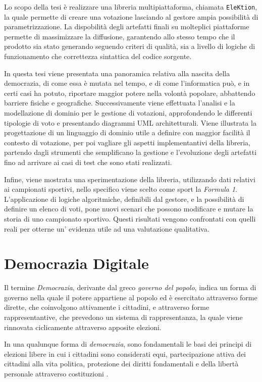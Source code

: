 \documentclass[12pt,a4paper,openright,twoside]{book}
\begin{document}
Lo scopo della tesi è realizzare una libreria multipiattaforma, chiamata \texttt{EleKtion}, la quale permette di creare una votazione
lasciando al gestore ampia possibilità di parametrizzazione.
La dispobilità degli artefatti finali su molteplici piattaforme permette di massimizzare la diffusione, garantendo
allo stesso tempo che il prodotto sia stato generando seguendo criteri di qualità, sia a livello di logiche di funzionamento
che correttezza sintattica del codice sorgente.

In questa tesi viene presentata una panoramica relativa alla nascita della democrazia, di come essa è mutata nel tempo,
e di come l'informatica può, e in certi casi ha potuto, riportare maggior potere nella volontà popolare, abbattendo barriere
fisiche e geografiche.
Successivamente viene effettuata l'analisi e la modellazione di dominio per le gestione di votazioni,
approfondendo le differenti tipologie di voto e presentando diagrammi UML architetturali.
Viene illustrata la progettazione di un linguaggio di dominio utile a definire con maggior facilità il contesto di votazione,
per poi vagliare gli aspetti implementantivi della libreria, partendo dagli strumenti che semplificano la gestione e l'evoluzione
degli artefatti fino ad arrivare ai casi di test che sono stati realizzati.

Infine, viene mostrata una sperimentazione della libreria, utilizzando dati relativi ai campionati sportivi, nello specifico
viene scelto come sport la \textit{Formula 1}. L'applicazione di logiche algoritmiche, definibili dal gestore, e la possibilità
di definire un elenco di voti, pone nuovi scenari che possono modificare e mutare la storia di uno campionato sportivo.
Questi risultati vengono confrontati con quelli reali per otterne un' evidenza utile ad una valutazione qualitativa.


\chapter{Democrazia Digitale}
Il termine \textit{Democrazia}, derivante dal greco \textit{governo del popolo},
indica un forma di governo nella quale il potere appartiene al popolo ed è esercitato attraverso forme dirette, che coinvolgono attivamente
i cittadini, e attraverso forme rappresentantive, che prevedono un sistema di rappresentanza, la quale viene rinnovata ciclicamente
attraverso apposite elezioni.

In una qualunque forma di \textit{democrazia}, sono fondamentali le basi dei principi di elezioni libere in cui i cittadini sono considerati equi, partecipazione
attiva dei cittadini alla vita politica, protezione dei diritti fondamentali e della libertà personale attraverso costituzioni \cite{vinod2017state}.
\end{document}
